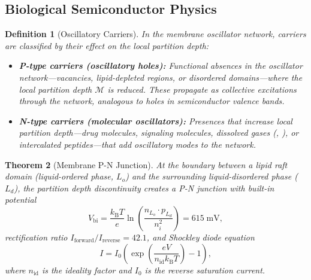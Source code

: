 \documentclass[twocolumn,10pt]{article}
\newtheorem{theorem}{Theorem}[section]
\newtheorem{definition}[theorem]{Definition}
\theoremstyle{remark}
\newcommand{\kB}{k_{\mathrm{B}}}
\newcommand{\Depth}{\mathcal{M}}
\begin{document}
\subsection{Biological Semiconductor Physics}

\begin{definition}[Oscillatory Carriers]
\label{def:carriers}
In the membrane oscillator network, carriers are classified by their effect on the local partition depth:
\begin{itemize}
\item \textbf{P-type carriers (oscillatory holes):} Functional absences in the oscillator network---vacancies, lipid-depleted regions, or disordered domains---where the local partition depth $\Depth$ is reduced. These propagate as collective excitations through the network, analogous to holes in semiconductor valence bands.
\item \textbf{N-type carriers (molecular oscillators):} Presences that increase local partition depth---drug molecules, signaling molecules, dissolved gases (, ), or intercalated peptides---that add oscillatory modes to the network.
\end{itemize}
\end{definition}

\begin{theorem}[Membrane P-N Junction]
\label{thm:pn_junction}
At the boundary between a lipid raft domain (liquid-ordered phase, $L_o$) and the surrounding liquid-disordered phase ($L_d$), the partition depth discontinuity creates a P-N junction with built-in potential
\begin{equation}
V_{\mathrm{bi}} = \frac{\kB T}{e} \ln\!\left(\frac{n_{L_o} \cdot p_{L_d}}{n_i^2}\right) = 615\;\mathrm{mV},
\label{eq:vbi}
\end{equation}
rectification ratio $I_{\mathrm{forward}}/I_{\mathrm{reverse}} = 42.1$, and Shockley diode equation
\begin{equation}
I = I_0 \!\left(\exp\!\left(\frac{eV}{n_{\mathrm{id}}\kB T}\right) - 1\right),
\label{eq:shockley}
\end{equation}
where $n_{\mathrm{id}}$ is the ideality factor and $I_0$ is the reverse saturation current.
\end{theorem}
\end{document}
